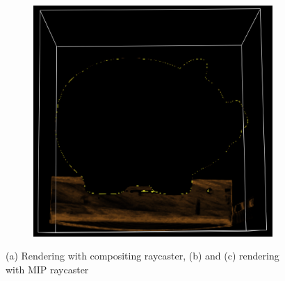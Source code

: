 \begin{figure}[h!]
\begin{subfigure}[t]{0.32\textwidth}
        \caption{ }
    \end{subfigure}
    \begin{subfigure}[t]{0.32\textwidth}
        \includegraphics[width=\textwidth]{img/nopig-mip.png}
        \caption{ }
    \end{subfigure}
    \caption{(a) Rendering with compositing raycaster, (b) and (c) rendering with MIP raycaster}
    \label{fig:compareraycasters}
\end{figure}


